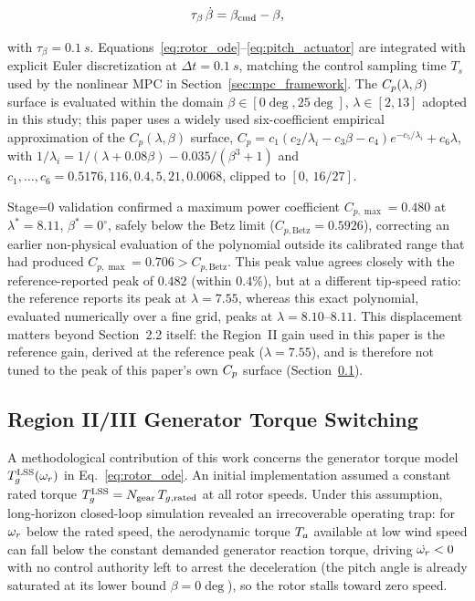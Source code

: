 \begin{equation}
\tau_\beta\,\dot{\beta} = \beta_{\text{cmd}} - \beta,
\label{eq:pitch_actuator}
\end{equation}

with $\tau_\beta = \SI{0.1}{s}$. Equations~\eqref{eq:rotor_ode}--\eqref{eq:pitch_actuator}
are integrated with explicit Euler discretization at $\Delta t = \SI{0.1}{s}$,
matching the control sampling time $T_s$ used by the nonlinear MPC in
Section~\ref{sec:mpc_framework}. The $C_p(\lambda,\beta)$ surface is
{\color{auditP2}evaluated within the domain $\beta \in [0\deg, 25\deg]$,
$\lambda \in [2, 13]$ adopted in this study; this paper uses a widely used
six-coefficient empirical approximation of the $C_p(\lambda,\beta)$ surface,
$C_p = c_1(c_2/\lambda_i - c_3\beta - c_4)e^{-c_5/\lambda_i} + c_6\lambda$,
with $1/\lambda_i = 1/(\lambda + 0.08\beta) - 0.035/(\beta^{3}+1)$ and
$c_1, \ldots, c_6 = 0.5176, 116, 0.4, 5, 21, 0.0068$, clipped to
$[0,\,16/27]$.}

Stage=0 validation confirmed a maximum power coefficient $C_{p,\max} = 0.480$ at $\lambda^* = 8.11$, $\beta^* = 0^\circ$, safely below the Betz limit ($C_{p,\text{Betz}} = 0.5926$), correcting an earlier non-physical evaluation of the polynomial outside its calibrated range that had produced $C_{p,\max} = 0.706 > C_{p,\text{Betz}}$. This peak value agrees closely with the reference-reported peak of $0.482$ \cite{jonkman2009} (within $0.4\%$), but at a different tip-speed
ratio: the reference reports its peak at $\lambda=7.55$, whereas this
exact polynomial, evaluated numerically over a fine grid, peaks at
$\lambda=8.10$--$8.11$. {\color{auditP2}This displacement matters beyond Section~2.2 itself:
the Region~II gain used in this paper is the reference gain, derived at the
reference peak ($\lambda=7.55$), and is therefore not tuned to the peak of
this paper's own $C_p$ surface (Section~\ref{subsec:torque_switching}).}

\subsection{Region II/III Generator Torque Switching}
\label{subsec:torque_switching}

A methodological contribution of this work concerns the generator torque
model $T_g^{\text{LSS}}(\omega_r)$ in Eq.~\eqref{eq:rotor_ode}. An initial
implementation assumed a constant rated torque
$T_g^{\text{LSS}} = N_{\text{gear}}\,T_{g,\text{rated}}$ at all rotor
speeds. Under this assumption, long-horizon closed-loop simulation revealed
an irrecoverable operating trap: for $\omega_r$ below the rated speed, the
aerodynamic torque $T_a$ available at low wind speed can fall below the
constant demanded generator reaction torque, driving $\dot{\omega_r} < 0$
with no control authority left to arrest the deceleration (the pitch angle
is already saturated at its lower bound $\beta = 0\deg$), so the rotor
stalls toward zero speed.

